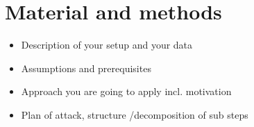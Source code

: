 \documentclass{article}
\begin{document}

%
%


\section{Material and methods}

\begin{itemize}
\item Description of your setup and your data
\item Assumptions and prerequisites
\item Approach you are going to apply incl. motivation
\item Plan of attack, structure /decomposition of sub steps
\end{itemize}
\end{document}
